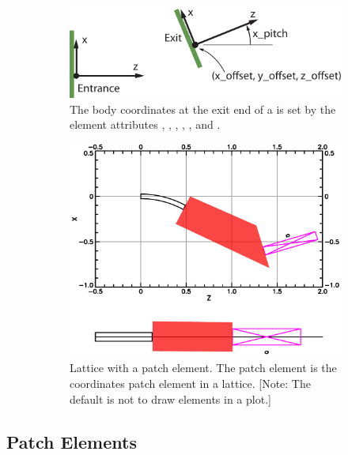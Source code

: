 \documentclass{hitec}     %
\begin{document}
\begin{figure}[tb]
  \centering
  \begin{subfigure}[t]{0.48\textwidth}
    \includegraphics[width=\textwidth]{patch.pdf}
    \vspace*{5pt}
    \caption{The body coordinates at the exit end of a  is set by the element attributes
, , , , , and .}
    \label{f:patch}
  \end{subfigure}
  \hfil
  \begin{subfigure}[t]{0.48\textwidth}
    \includegraphics[width=\textwidth]{patch-example.pdf}
    \caption{Lattice with a patch element.
The patch element is the coordinates patch element in a lattice. [Note: The default is not to
draw  elements in a  plot.]}
    \label{f:patch.example}
  \end{subfigure}
  \caption{}
\end{figure}

\subsection{Patch Elements}
\label{s:patch}
\end{document}
